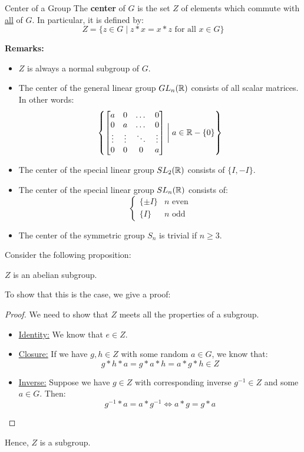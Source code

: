 \documentclass[letterpaper]{article}
\begin{document}
\begin{definition}{Center of a Group}{}
    The \textbf{center} of $G$ is the set $Z$ of elements which commute with \underline{all} of $G$. In particular, it is defined by: 
    \[Z = \{z \in G \mid z * x = x * z \text{ for all } x \in G\}\]
\end{definition}
\textbf{Remarks:}
\begin{itemize}
    \item $Z$ is always a normal subgroup of $G$. 
    \item The center of the general linear group $GL_{n}(\mathbb{R})$ consists of all scalar matrices. In other words:
    \[\left\{\begin{bmatrix}
        a & 0 & \dots & 0 \\ 
        0 & a & \dots & 0 \\ 
        \vdots & \vdots & \ddots & \vdots \\ 
        0 & 0 & 0 & a 
    \end{bmatrix} \mathrel{\bigg|} a \in \mathbb{R} - \{0\}\right\}\]
    \item The center of the special linear group $SL_{2}(\mathbb{R})$ consists of $\{I, -I\}$. 
    \item The center of the special linear group $SL_{n}(\mathbb{R})$ consists of: 
    \[
        \begin{cases}
            \{\pm I\} & n \text{ even} \\ 
            \{I\} & n \text{ odd}
        \end{cases}    
    \]
    \item The center of the symmetric group $S_n$ is trivial if $n \geq 3$.
\end{itemize}

Consider the following proposition: 
\begin{mdframed}
    \begin{proposition}
        $Z$ is an abelian subgroup. 
    \end{proposition}
\end{mdframed}
To show that this is the case, we give a proof: 
\begin{mdframed}
    \begin{proof}
        We need to show that $Z$ meets all the properties of a subgroup. 
        \begin{itemize}
            \item \underline{Identity:} We know that $e \in Z$. 
            \item \underline{Closure:} If we have $g, h \in Z$ with some random $a \in G$, we know that: 
            \[g * h * a = g * a * h = a * g * h \in Z\]
            \item \underline{Inverse:} Suppose we have $g \in Z$ with corresponding inverse $g^{-1} \in Z$ and some $a \in G$. Then: 
            \[g^{-1} * a = a * g^{-1} \iff a * g = g * a\]
        \end{itemize}
    \end{proof}
    Hence, $Z$ is a subgroup. 
\end{mdframed}
\end{document}
